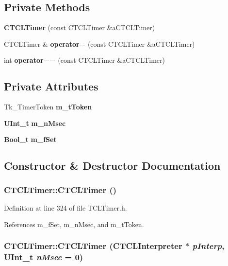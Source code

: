 \subsection*{Private Methods}
\begin{CompactItemize}
\item 
{\bf CTCLTimer} (const CTCLTimer \&a\-CTCLTimer)
\item 
CTCLTimer \& {\bf operator=} (const CTCLTimer \&a\-CTCLTimer)
\item 
int {\bf operator==} (const CTCLTimer \&a\-CTCLTimer)
\end{CompactItemize}
\subsection*{Private Attributes}
\begin{CompactItemize}
\item 
Tk\_\-Timer\-Token {\bf m\_\-t\-Token}
\item 
{\bf UInt\_\-t} {\bf m\_\-n\-Msec}
\item 
{\bf Bool\_\-t} {\bf m\_\-f\-Set}
\end{CompactItemize}


\subsection{Constructor \& Destructor Documentation}
\subsubsection{\setlength{\rightskip}{0pt plus 5cm}CTCLTimer::CTCLTimer ()\hspace{0.3cm}{\tt  [inline]}}\label{classCTCLTimer_a0}




Definition at line 324 of file TCLTimer.h.

References m\_\-f\-Set, m\_\-n\-Msec, and m\_\-t\-Token.
\subsubsection{\setlength{\rightskip}{0pt plus 5cm}CTCLTimer::CTCLTimer ({\bf CTCLInterpreter} $\ast$ {\em p\-Interp}, {\bf UInt\_\-t} {\em n\-Msec} = 0)\hspace{0.3cm}{\tt  [inline]}}\label{classCTCLTimer_a1}




